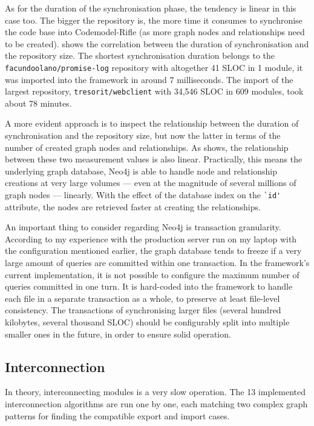 As for the duration of the synchronisation phase, the tendency is linear in this case too. The bigger the repository is, the more time it consumes to synchronise the code base into Codemodel-Rifle (as more graph nodes and relationships need to be created).  shows the correlation between the duration of synchronisation and the repository size. The shortest synchronisation duration belongs to the \lstinline{facundoolano/promise-log} repository with altogether 41 SLOC in 1 module, it was imported into the framework in around 7 milliseconds. The import of the largest repository, \lstinline{tresorit/webclient} with 34,546 SLOC in 609 modules, took about 78 minutes.

A more evident approach is to inspect the relationship between the duration of synchronisation and the repository size, but now the latter in terms of the number of created graph nodes and relationships. As  shows, the relationship between these two measurement values is also linear. Practically, this means the underlying graph database, Neo4j is able to handle node and relationship creations at very large volumes — even at the magnitude of several millions of graph nodes — linearly. With the effect of the database index on the \lstinline{`id'} attribute, the nodes are retrieved faster at creating the relationships.

An important thing to consider regarding Neo4j is transaction granularity. According to my experience with the production server run on my laptop with the configuration mentioned earlier, the graph database tends to freeze if a very large amount of queries are committed within one transaction. In the framework's current implementation, it is not possible to configure the maximum number of queries committed in one turn. It is hard-coded into the framework to handle each file in a separate transaction as a whole, to preserve at least file-level consistency. The transactions of synchronising larger files (several hundred kilobytes, several thousand SLOC) should be configurably split into multiple smaller ones in the future, in order to ensure solid operation.


\subsection{Interconnection}

In theory, interconnecting \es modules is a very slow operation. The 13 implemented interconnection algorithms are run one by one, each matching two complex graph patterns for finding the compatible export and import cases.

